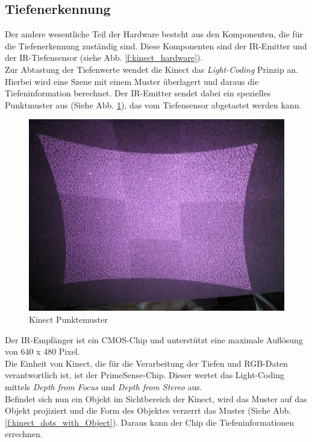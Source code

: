 \subsection{Tiefenerkennung}
	
	Der andere wesentliche Teil der Hardware besteht aus den Komponenten, die für die Tiefenerkennung
	zuständig sind. Diese Komponenten sind der \acf{IR-Emitter} und der IR-Tiefensensor (siehe	 Abb. 	 
	\ref{f:kinect_hardware}).\\
	\noindent
	Zur Abtastung der Tiefenwerte wendet die Kinect das \textit{Light-Coding} Prinzip an. Hierbei wird
	eine Szene mit einem Muster überlagert und daraus die Tiefeninformation berechnet.
	Der \acs{IR-Emitter} sendet dabei ein spezielles Punktmuster aus (Siehe Abb. \ref{f:kinect_dots}),
	das vom Tiefensensor abgetastet werden kann.	
	
	\begin{figure}[H]						
		\centering							
		\includegraphics[scale=0.5]{Bilder/kinect_dots.jpg}			
		\caption{Kinect Punktemuster}						
		\label{f:kinect_dots}						
	\end{figure}
	
	\noindent	
	Der IR-Empfänger ist ein \acf{CMOS}-Chip und unterstützt eine maximale Auflösung
	von 640 x 480 Pixel.
	\\
	Die Einheit von Kinect, die für die Verarbeitung der Tiefen und RGB-Daten verantwortlich ist, ist
	der PrimeSense-Chip. Dieser wertet das Light-Coding mittels \textit{Depth from Focus} und 
	\textit{Depth from Stereo} aus.\cite{pdf:maccormick}
	\\
	Befindet sich nun ein Objekt im Sichtbereich der Kinect, wird das Muster auf das Objekt projiziert und
	die Form des Objektes verzerrt das Muster (Siehe Abb. \ref{f:kinect_dots_with_Object}). Daraus kann der 
	Chip die Tiefeninformationen errechnen.	
	
